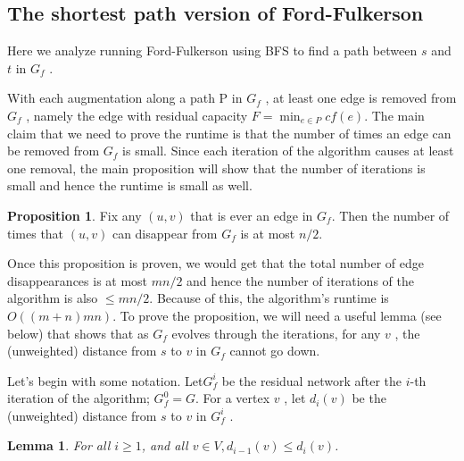 \documentclass [12pt]{article}
\newtheorem{lemma}[theorem]{Lemma}
\theoremstyle{definition}
\newtheorem{proposition}{Proposition}
\begin{document}
\subsection{The shortest path version of Ford-Fulkerson}
 
Here we analyze running Ford-Fulkerson using BFS to find a path between $s$ and $t$ in $G_f$ . 

With each augmentation along a path P in $G_f$ , at least one edge is removed from $G_f$ , namely the edge with residual capacity $F = \min_{e\in P} cf (e)$. The main claim that we need to prove the runtime is that the number of times an edge can be removed from $G_f$ is small. Since each iteration of the algorithm causes at least one removal, the main proposition will show that the number of iterations is small and hence the runtime is small as well.

\begin{proposition}
Fix any $(u, v )$ that is ever an edge in $G_f$. Then the number of times that $(u, v )$ can disappear from $G_f$ is at most $n/2$.
\end{proposition}

Once this proposition is proven, we would get that the total number of edge disappearances is at most $m n/2$ and hence the number of iterations of the algorithm is also $\leq mn/2$. Because of this, the algorithm's runtime is $O((m + n)mn)$. To prove the proposition, we will need a useful lemma (see below) that shows that as $G_f$ evolves through the iterations, for any $v$ , the (unweighted) distance from $s$ to $v$ in $G_f$ cannot go down. 

Let's begin with some notation. Let$ G^i_f$ be the residual network after the $i$-th iteration of the algorithm; $G^0_f = G$. For a vertex $v$ , let $d_i (v )$ be the (unweighted) distance from $s$ to $v$ in $G^i_f$ .

\begin{lemma}
For all $i \geq 1$, and all $v \in V , d_{i-1}(v ) \leq d_i (v )$.
\end{lemma}
\end{document}
